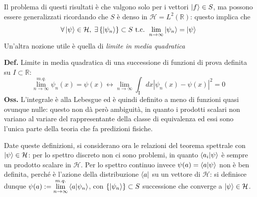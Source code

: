\noindent{}

Il problema di questi risultati è che valgono solo per i vettori $\ket{f}\in S$,
ma possono essere generalizzati ricordando che $ S $ è denso in
$ \mathcal{H} = L^2(\mathbb{R}) $: questo implica che
$$ \forall\ket{\psi}\in\mathcal{H},\; \exists \left\{ \ket{\psi_n} \right\}\subset S
\text{ t.c. } \lim\limits_{n\to\infty}\ket{\psi_n} = \ket{\psi} $$
Un'altra nozione utile è quella di \textit{limite in media quadratica}

\textbf{Def.} Limite in media quadratica di una successione di funzioni di prova
definita su $ I\subset\mathbb{R} $:
$$ \lim\limits_{n\to\infty}^{m.q.} \psi_n(x) = \psi(x) \leftrightarrow 
\lim\limits_{n\to\infty} \int_\text{I}^{}dx \left| \psi_n(x)-\psi(x)\right|^2 = 0$$
\textbf{Oss.} L'integrale è alla Lebesgue ed è quindi definito a meno di funzioni
quasi ovunque nulle: questo non dà però ambiguità, in quanto i prodotti scalari non
variano al variare del rappresentante della classe di equivalenza ed essi sono l'unica
parte della teoria che fa predizioni fisiche.

Date queste definizioni, si considerano ora le relazioni del teorema spettrale con
$ \ket{\psi}\in\mathcal{H}$: per lo spettro discreto non ci sono problemi, in quanto
$ \bra{a_i}\ket{\psi} $ è sempre un prodotto scalare in $ \mathcal{H} $. Per lo spettro
continuo invece $ \psi(a) = \bra{a}\ket{\psi} $ non è ben definita, perché è l'azione
della distribuzione $ \bra{a} $ su un vettore di $ \mathcal{H} $: si definisce dunque
$ \psi(a):=\lim\limits_{n\to\infty}^{m.q.}\bra{a}\ket{\psi_n} $, con
$ \left\{ \ket{\psi_n} \right\} \subset S$ successione che converge a
$ \ket{\psi}\in\mathcal{H} $.

